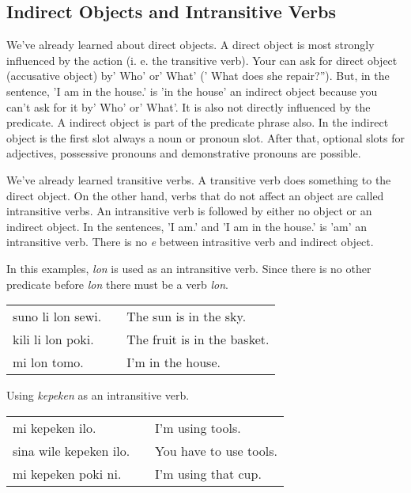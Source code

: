 \subsection*{Indirect Objects and Intransitive Verbs}
%
%
We've already learned about direct objects. 
A direct object is most strongly influenced by the action (i. e. the transitive verb). 
Your can ask for direct object (accusative object) by' Who' or' What' (' What does she repair?'').
But, in the sentence, 'I am in the house.' is 'in the house' an indirect object because you can't ask for it by' Who' or' What'.
It is also not directly influenced by the predicate. 
A indirect object is part of the predicate phrase also. 
In the indirect object is the first slot always a noun or pronoun slot.
After that, optional slots for adjectives, possessive pronouns and demonstrative pronouns are possible. 

We've already learned transitive verbs. 
A transitive verb does something to the direct object. 
On the other hand, verbs that do not affect an object are called intransitive verbs. 
An intransitive verb is followed by either no object or an indirect object. 
In the sentences, 'I am.' and 'I am in the house.' is 'am' an intransitive verb. 
There is no \textit{e} between intrasitive verb and indirect object.

%
In this examples, \textit{lon} is used as an intransitive verb. 
Since there is no other predicate before \textit{lon} there must be a verb \textit{lon}.

\begin{supertabular}{p{5,5cm}|ll}
suno li lon sewi. && The sun is in the sky. \\
kili li lon poki. && The fruit is in the basket. \\
mi lon tomo. && I'm in the house. \\
\end{supertabular} 

%
Using \textit{kepeken} as an intransitive verb.
 
\begin{supertabular}{p{5,5cm}|ll}
mi kepeken ilo. && I'm using tools. \\
sina wile kepeken ilo. && You have to use tools. \\
mi kepeken poki ni. && I'm using that cup. \\
\end{supertabular} 

